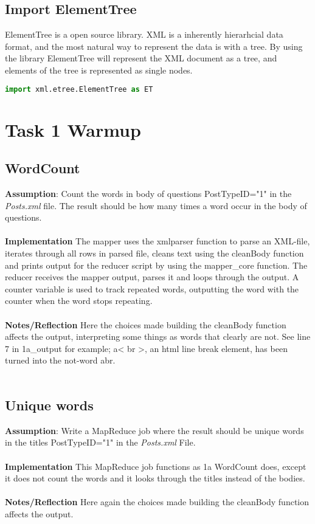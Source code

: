\documentclass[fleqn,10pt]{wlscirep}
\begin{document}
\subsection{Import ElementTree}
ElementTree is a open source library. XML is a inherently hierarhcial data format, and the most natural way to represent the data is with a tree. By using the library ElementTree will represent the XML document as a tree, and elements of the tree is represented as single nodes. 
\begin{lstlisting}[language=Python, caption= Import for ElementTree]
import xml.etree.ElementTree as ET
\end{lstlisting}
\section{Task 1 Warmup}
\subsection{WordCount}
\textbf{Assumption}: Count the words in body of questions PostTypeID="1"  in the \textit{Posts.xml}  file. The result should be how many times a word occur in the body of questions.\\ \\
\textbf{Implementation} The mapper uses the xmlparser function to parse an XML-file, iterates through all rows in parsed file, cleans text using the cleanBody function and prints output for the reducer script by using the mapper\_core function.
The reducer receives the mapper output, parses it and loops through the output. A counter variable is used to track repeated words, outputting the word with the counter when the word stops repeating. \\ \\
\textbf{Notes/Reflection} Here the choices made building the cleanBody function affects the output, interpreting some things as words that clearly are not. See line 7 in 1a\_output for example; a< br >, an html line break element, has been turned into the not-word abr. \\ \\



\subsection{Unique words}
\textbf{Assumption}: Write a MapReduce job where the result should be unique words in the titles PostTypeID="1" in the \textit{Posts.xml} File. \\ \\
\textbf{Implementation} This MapReduce job functions as 1a WordCount does, except it does not count the words and it looks through the titles instead of the bodies. \\ \\
\textbf{Notes/Reflection} Here again the choices made building the cleanBody function affects the output.

\end{document}

